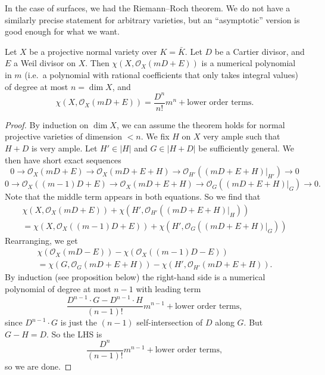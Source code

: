 \documentclass[a4paper]{article}
\newcommand\Pic{\mathrm{Pic}}
\begin{document}

In the case of surfaces, we had the Riemann--Roch theorem. We do not have a similarly precise statement for arbitrary varieties, but an ``asymptotic'' version is good enough for what we want.
\begin{thm}
  Let $X$ be a projective normal variety over $K = \bar{K}$. Let $D$ be a Cartier divisor, and $E$ a Weil divisor on $X$. Then $\chi(X, \mathcal{O}_X(mD + E))$ is a numerical polynomial in $m$ (i.e.\ a polynomial with rational coefficients that only takes integral values) of degree at most $n = \dim X$, and
  \[
    \chi(X, \mathcal{O}_X(mD + E)) = \frac{D^n}{n!} m^n + \text{lower order terms}.
  \]
\end{thm}

\begin{proof}
  By induction on $\dim X$, we can assume the theorem holds for normal projective varieties of dimension $< n$. We fix $H$ on $X$ very ample such that $H + D$ is very ample. Let $H' \in |H|$ and $G \in |H + D|$ be sufficiently general. We then have short exact sequences
  \[
    0 \to \mathcal{O}_X(mD + E) \to \mathcal{O}_X(mD + E + H) \to \mathcal{O}_{H'}((mD + E + H)|_{H'}) \to 0
  \]
  \[
    0 \to \mathcal{O}_X((m - 1)D + E) \to \mathcal{O}_X(mD + E + H) \to \mathcal{O}_G((mD + E + H)|_G) \to 0.
  \]
  Note that the middle term appears in both equations. So we find that
  \begin{multline*}
    \chi(X, \mathcal{O}_X(mD + E)) + \chi (H', \mathcal{O}_{H'}((mD + E + H)|_H)) \\
    = \chi(X, \mathcal{O}_X((m - 1)D + E)) + \chi (H', \mathcal{O}_{G}((mD + E + H)|_G))
  \end{multline*}
  Rearranging, we get
  \begin{multline*}
    \chi(\mathcal{O}_X(mD - E)) - \chi(\mathcal{O}_X((m - 1)D - E)) \\
    = \chi(G, \mathcal{O}_G(mD + E + H)) - \chi(H', \mathcal{O}_{H'} (mD + E + H)).
  \end{multline*}
  By induction (see proposition below) the right-hand side is a numerical polynomial of degree at most $n - 1$ with leading term
  \[
    \frac{D^{n - 1} \cdot G - D^{n - 1} \cdot H}{(n - 1)!} m^{n - 1} + \text{lower order terms},
  \]
  since $D^{n - 1}\cdot G$ is just the $(n-1)$ self-intersection of $D$ along $G$. But $G - H = D$. So the LHS is
  \[
    \frac{D^n}{(n - 1)!} m^{n - 1} + \text{lower order terms},
  \]
  so we are done.
\end{proof}
\end{document}
